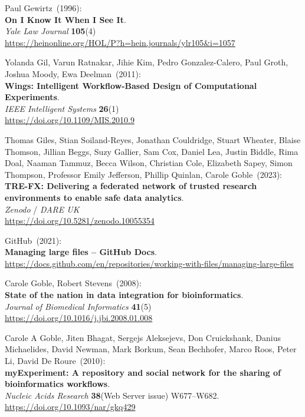 \begin{thebibliography}{9}
Paul Gewirtz~(1996):\\
\textbf{On I Know It When I See It}.\\
\emph{Yale Law Journal} \textbf{105}(4)\\
\url{https://heinonline.org/HOL/P?h=hein.journals/ylr105&i=1057}

Yolanda Gil, Varun Ratnakar, Jihie Kim, Pedro Gonzalez-Calero, Paul Groth, Joshua Moody, Ewa Deelman~(2011): \\
\textbf{Wings: Intelligent Workflow-Based Design of Computational Experiments}.\\
\emph{IEEE Intelligent Systems} \textbf{26}(1) \\
\url{https://doi.org/10.1109/MIS.2010.9}

Thomas Giles, Stian Soiland-Reyes, Jonathan Couldridge, Stuart Wheater, Blaise Thomson, Jillian Beggs, Suzy Gallier, Sam Cox, Daniel Lea, Justin Biddle, Rima Doal, Naaman Tammuz, Becca Wilson, Christian Cole, Elizabeth Sapey, Simon Thompson, Professor Emily Jefferson, Phillip Quinlan, Carole Goble~(2023): \\
\textbf{TRE-FX: Delivering a federated network of trusted research environments to enable safe data analytics}.\\
\emph{Zenodo} / \emph{DARE UK} \\
\url{https://doi.org/10.5281/zenodo.10055354}

GitHub~(2021): \\
\textbf{Managing large files -- GitHub Docs}.\\
\url{https://docs.github.com/en/repositories/working-with-files/managing-large-files}

Carole Goble, Robert Stevens~(2008): \\
\textbf{State of the nation in data integration for bioinformatics}.\\
\emph{Journal of Biomedical Informatics} \textbf{41}(5) \\
\url{https://doi.org/10.1016/j.jbi.2008.01.008}

Carole A Goble, Jiten Bhagat, Sergejs Aleksejevs, Don Cruickshank, Danius Michaelides, David Newman, Mark Borkum, Sean Bechhofer, Marco Roos, Peter Li, David De Roure~(2010): \\
\textbf{myExperiment: A repository and social network for the sharing of bioinformatics workflows}.\\
\emph{Nucleic Acids Research} \textbf{38}(Web Server issue)
W677--W682.\\
\url{https://doi.org/10.1093/nar/gkq429}


\end{thebibliography}
